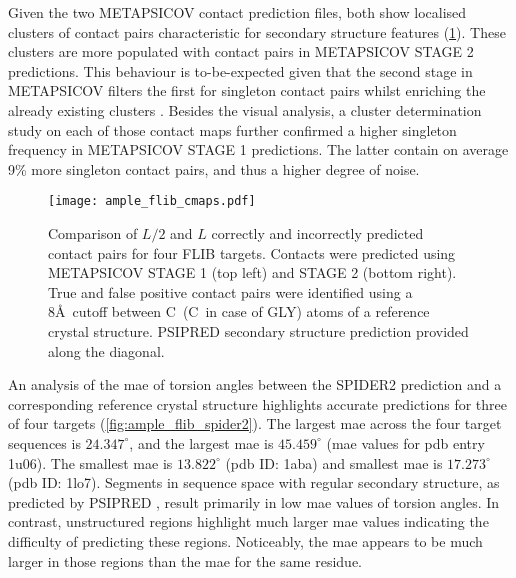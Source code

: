 Given the two METAPSICOV contact prediction files, both show localised clusters of contact pairs characteristic for secondary structure features (\cref{fig:ample_flib_cmaps}). These clusters are more populated with contact pairs in METAPSICOV STAGE 2 predictions. This behaviour is to-be-expected given that the second stage in METAPSICOV filters the first for singleton contact pairs whilst enriching the already existing clusters \cite{Jones2015-wp}. Besides the visual analysis, a cluster determination study on each of those contact maps further confirmed a higher singleton frequency in METAPSICOV STAGE 1 predictions. The latter contain on average 9\% more singleton contact pairs, and thus a higher degree of noise.

\begin{figure}[H]
	\centering
	\texttt{[image: ample\_flib\_cmaps.pdf]}
	\caption[Contact map comparison for FLIB targets]{Comparison of $L/2$ and $L$ correctly and incorrectly predicted contact pairs for four FLIB targets. Contacts were predicted using METAPSICOV \cite{Jones2015-wp} STAGE 1 (top left) and STAGE 2 (bottom right). True and false positive contact pairs were identified using a 8\AA\ cutoff between C\textalpha\ (C\textbeta\ in case of GLY) atoms of a reference crystal structure. PSIPRED \cite{Jones1999-fi} secondary structure prediction provided along the diagonal.}
	\label{fig:ample_flib_cmaps}
\end{figure}

An analysis of the \gls{mae} of torsion angles between the SPIDER2 \cite{Heffernan2015-wp} prediction and a corresponding reference crystal structure highlights accurate predictions for three of four targets (\cref{fig:ample_flib_spider2}). The largest \gls{mae}\textsubscript{\textphi} across the four target sequences is $24.347^{\circ}$, and the largest \gls{mae}\textsubscript{\textpsi} is $45.459^{\circ}$ (\gls{mae} values for \gls{pdb} entry 1u06). The smallest \gls{mae}\textsubscript{\textphi} is $13.822^{\circ}$ (\gls{pdb} ID: 1aba) and smallest \gls{mae}\textsubscript{\textpsi} is $17.273^{\circ}$ (\gls{pdb} ID: 1lo7). Segments in sequence space with regular secondary structure, as predicted by PSIPRED \cite{Jones1999-fi}, result primarily in low \gls{mae} values of torsion angles. In contrast, unstructured regions highlight much larger \gls{mae} values indicating the difficulty of predicting these regions. Noticeably, the \gls{mae}\textsubscript{\textpsi} appears to be much larger in those regions than the \gls{mae}\textsubscript{\textphi} for the same residue.

